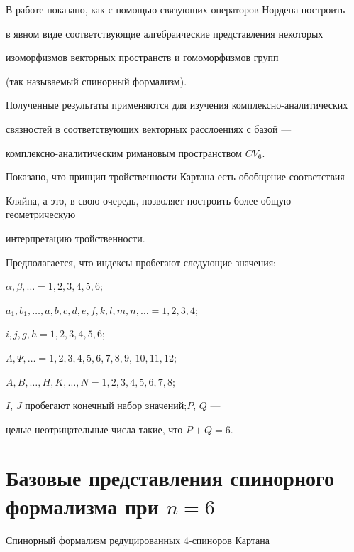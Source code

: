 \label{begin}





В работе показано, как с помощью связующих операторов Нордена построить


в явном виде соответствующие алгебраические представления некоторых


изоморфизмов векторных пространств и гомоморфизмов групп


(так называемый спинорный формализм).


Полученные результаты применяются для изучения комплексно-аналитических


связностей в соответствующих векторных расслоениях с базой ---


комплексно-аналитическим римановым пространством $CV_6$.


Показано, что принцип тройственности Картана есть обобщение соответствия


Кляйна, а это, в свою очередь, позволяет построить более общую геометрическую


интерпретацию тройственности.





Предполагается, что индексы пробегают следующие значения:


$\alpha,\beta,\dotsc=1,2,3,4,5,6$;\linebreak


$a_1,b_1,\dotsc,a,b,c,d,e,f,k,l,m,n,\dotsc=1,2,3,4$;


%


$i,j,g,h=1,2,3,4,5,6$;


$\Lambda,\Psi,\dotsc=1,2,3,4,5,6,7,8,9$, $10,11,12$;


$A,B,\dotsc,H,K,\dotsc,N=1,2,3,4,5,6,7,8$;


$I$, $J$ пробегают конечный набор значений;\linebreak $P$, $Q$ ---


целые неотрицательные числа такие, что $P+Q=6$.





\section{Базовые представления спинорного формализма при $n=6$}





Спинорный формализм редуцированных 4-спиноров Картана



